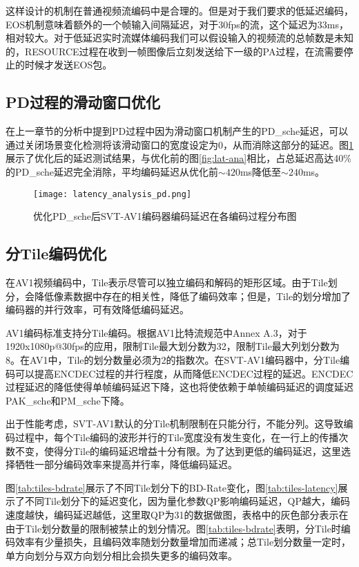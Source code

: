   这样设计的机制在普通视频流编码中是合理的。但是对于我们要求的低延迟编码，EOS机制意味着额外的一个帧输入间隔延迟，对于30fps的流，这个延迟为33ms，相对较大。对于低延迟实时流媒体编码我们可以假设输入的视频流的总帧数是未知的，RESOURCE过程在收到一帧图像后立刻发送给下一级的PA过程，在流需要停止的时候才发送EOS包。

\subsection{PD过程的滑动窗口优化}
	在上一章节的分析中提到PD过程中因为滑动窗口机制产生的PD\_sche延迟，可以通过关闭场景变化检测将该滑动窗口的宽度设定为0，从而消除这部分的延迟。图\ref{fig:lat-ana-pd}展示了优化后的延迟测试结果，与优化前的图\ref{fig:lat-ana}相比，占总延迟高达40\%的PD\_sche延迟完全消除，平均编码延迟从优化前$\sim 420$ms降低至$\sim 240$ms。

	\begin{figure}[htbp]
		\centering
		\texttt{[image: latency\_analysis\_pd.png]}
		\caption{优化PD\_sche后SVT-AV1编码器编码延迟在各编码过程分布图}
		\label{fig:lat-ana-pd}
	\end{figure}

\subsection{分Tile编码优化}
	在AV1视频编码中，Tile\cite{a.fuldsethfuldsethTiles}表示尽管可以独立编码和解码的矩形区域。由于Tile划分，会降低像素数据中存在的相关性，降低了编码效率；但是，Tile的划分增加了编码器的并行效率，可有效降低编码延迟\cite{misraOverviewTilesHEVC2013}。

	AV1编码标准支持分Tile编码。根据AV1比特流规范\cite{rivazAV1BitstreamDecoding2019}中Annex A.3，对于1920x1080p@30fps的应用，限制Tile最大划分数为32，限制Tile最大列划分数为8。在AV1中，Tile的划分数量必须为2的指数次。在SVT-AV1编码器中，分Tile编码可以提高ENCDEC过程的并行程度，从而降低ENCDEC过程的延迟。ENCDEC过程延迟的降低使得单帧编码延迟下降，这也将使依赖于单帧编码延迟的调度延迟PAK\_sche和PM\_sche下降。

  出于性能考虑，SVT-AV1默认的分Tile机制限制在只能分行，不能分列。这导致编码过程中，每个Tile编码的波形并行的Tile宽度没有发生变化，在一行上的传播次数不变，使得分Tile的编码延迟增益十分有限。为了达到更低的编码延迟，这里选择牺牲一部分编码效率来提高并行率，降低编码延迟。

  图\ref{tab:tiles-bdrate}展示了不同Tile划分下的BD-Rate变化，图\ref{tab:tiles-latency}展示了不同Tile划分下的延迟变化，因为量化参数QP影响编码延迟，QP越大，编码速度越快，编码延迟越低，这里取QP为31的数据做图，表格中的灰色部分表示在由于Tile划分数量的限制被禁止的划分情况。图\ref{tab:tiles-bdrate}表明，分Tile时编码效率有少量损失，且编码效率随划分数量增加而递减；总Tile划分数量一定时，单方向划分与双方向划分相比会损失更多的编码效率。

